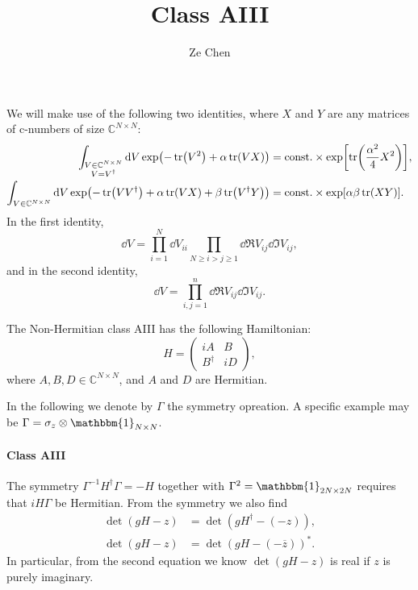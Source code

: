 \documentclass{article}
\title{Class AIII}
\author{Ze Chen}
\begin{document}
\newcommand{\mynote}[1]{\marginnote{\color{gray}#1}}

\newcommand{\remove}[1]{}

\maketitle

We will make use of the following two identities, where $X$ and $Y$ are any matrices of c-numbers of size $\mathbb{C}^{N\times N}$:
\begin{align*}
    \int_{\substack{V\in \mathbb{C}^{N\times N} \\ V=V^\dagger}} \dd{V} \exp(-\tr(V^2) + \alpha\tr(VX)) &= \mathrm{const.} \times \exp[\tr(\frac{\alpha^2}{4}X^2)], \\
    \int_{V\in \mathbb{C}^{N\times N}} \dd{V} \exp(-\tr(VV^\dagger) + \alpha\tr(VX) + \beta \tr(V^\dagger Y)) &= \mathrm{const.} \times \exp[\alpha\beta \tr(XY)].
\end{align*}
In the first identity,
\[ \dd{V} = \prod_{i=1}^N \dd{V_{ii}} \prod_{N \ge i>j\ge 1} \dd{\Re V_{ij}} \dd{\Im V_{ij}}, \]
and in the second identity,
\[ \dd{V} = \prod_{i,j=1}^n \dd{\Re V_{ij}} \dd{\Im V_{ij}}. \]

\par
The Non-Hermitian class AIII has the following Hamiltonian:
\begin{equation}
    H = \begin{pmatrix}
        iA & B \\
        B^\dagger & iD
    \end{pmatrix},
\end{equation}
where $A,B,D \in \mathbb{C}^{N\times N}$, and $A$ and $D$ are Hermitian. \mynote{$N$}
\par
In the following we denote by $\Gamma$\mynote{$\Gamma$} the symmetry opreation.
A specific example may be $\Gamma = \sigma_z\otimes \mathbbm{1}_{N\times N}$.

\paragraph*{Class AIII}
The symmetry $\Gamma^{-1}H^\dagger \Gamma = -H$ together with $\Gamma^2 = \mathbbm{1}_{2N\times 2N}$ requires that $i H \Gamma$ be Hermitian.
From the symmetry we also find
\begin{align}
    \det(gH-z) &= \det(gH^\dagger - (-z)), \\
    \det(gH-z) &= \det(gH - (-\overline{z}))^*.
\end{align}
In particular, from the second equation we know $\det(gH - z)$ is real if $z$ is purely imaginary.
\end{document}
